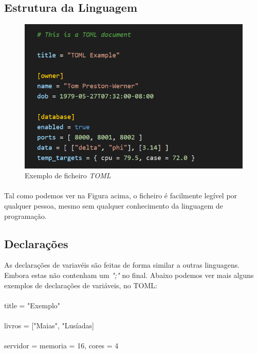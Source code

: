 \documentclass[a4paper]{report}
\begin{document}
\subsection{Estrutura da Linguagem}
\begin{figure}[H]
    \centering
    \includegraphics{imagens/ExemploTOML.png}
    \caption{Exemplo de ficheiro \textit{TOML}}
    \label{fig:my_label}
\end{figure}
\paragraph{} Tal como podemos ver na Figura acima, o ficheiro é facilmente legível por qualquer pessoa, mesmo sem qualquer conhecimento da linguagem de programação.

\subsection{Declarações}
As declarações de variavéis são feitas de forma similar a outras linguagens. Embora estas não contenham um \textit{";"} no final.
Abaixo podemos ver mais alguns exemplos de declarações de variáveis, no TOML:
\paragraph{}
title = "Exemplo"
\paragraph{}
livros = ["Maias", "Lusíadas]
\paragraph{}
servidor = { memoria = 16, cores = 4 }
\end{document}
